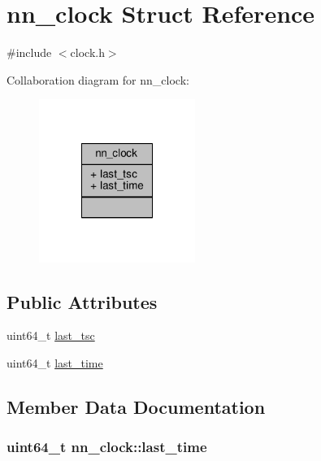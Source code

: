 \hypertarget{structnn__clock}{}\section{nn\+\_\+clock Struct Reference}
\label{structnn__clock}


{\ttfamily \#include $<$clock.\+h$>$}



Collaboration diagram for nn\+\_\+clock\+:\nopagebreak
\begin{figure}[H]
\begin{center}
\leavevmode
\includegraphics[width=144pt]{structnn__clock__coll__graph}
\end{center}
\end{figure}
\subsection*{Public Attributes}
\begin{DoxyCompactItemize}
\item 
uint64\+\_\+t \hyperlink{structnn__clock_ae1c93ad0ea0d06895e0f116f2c132b89}{last\+\_\+tsc}
\item 
uint64\+\_\+t \hyperlink{structnn__clock_a45a8e406b8c899971310f8c4967aa97e}{last\+\_\+time}
\end{DoxyCompactItemize}


\subsection{Member Data Documentation}
\subsubsection[{last\+\_\+time}]{\setlength{\rightskip}{0pt plus 5cm}uint64\+\_\+t nn\+\_\+clock\+::last\+\_\+time}\hypertarget{structnn__clock_a45a8e406b8c899971310f8c4967aa97e}{}\label{structnn__clock_a45a8e406b8c899971310f8c4967aa97e}
